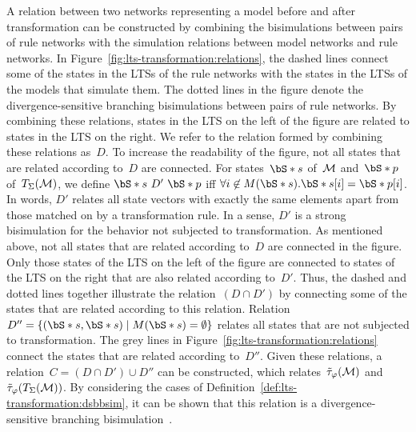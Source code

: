 A relation between two networks representing a model before and after transformation can be constructed by combining the bisimulations between pairs of rule networks with the simulation relations between model networks and rule networks.
In Figure~\ref{fig:lts-transformation:relations}, the dashed lines connect some of the states in the LTSs of the rule networks with the states in the LTSs of the models that simulate them.
The dotted lines in the figure denote the divergence-sensitive branching bisimulations between pairs of rule networks.
By combining these relations, states in the LTS on the left of the figure are related to states in the LTS on the right.
We refer to the relation formed by combining these relations as~$D$.
To increase the readability of the figure, not all states that are related according to~$D$ are connected.
For states~$\vectornot{s}$ of~$\mathcal{M}$ and~$\vectornot{p}$ of~$T_{\Sigma} (\mathcal{M})$, we define $\vectornot{s}\ D'\ \vectornot{p}$ iff $\forall i \not \in M(\vectornot{s}) . \vectornot{s}[i] = \vectornot{p}[i]$.
In words, $D'$ relates all state vectors with exactly the same elements apart from those matched on by a transformation rule.
In a sense, $D'$ is a strong bisimulation for the behavior not subjected to transformation.
As mentioned above, not all states that are related according to~$D$ are connected in the figure.
Only those states of the LTS on the left of the figure are connected to states of the LTS on the right that are also related according to~$D'$.
Thus, the dashed and dotted lines together illustrate the relation~$(D \cap D')$ by connecting some of the states that are related according to this relation.
Relation~$D'' = \{ (\vectornot{s}, \vectornot{s}) \mid M(\vectornot{s}) = \emptyset \}$ relates all states that are not subjected to transformation.
The grey lines in Figure~\ref{fig:lts-transformation:relations} connect the states that are related according to~$D''$.
Given these relations, a relation~$C = (D \cap D') \cup D''$ can be constructed, which relates~$\tilde\tau_\varphi(\mathcal{M})$ and~$\tilde\tau_\varphi(T_{\Sigma} (\mathcal{M}))$.
By considering the cases of Definition~\ref{def:lts-transformation:dsbbsim}, it can be shown that this relation is a divergence-sensitive branching bisimulation~\cite{EngelenWijsPropPres2012}. 